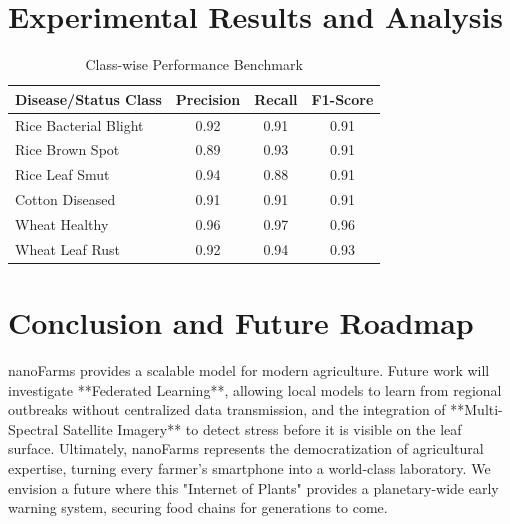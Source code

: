 \documentclass[11pt,onecolumn]{article}
\begin{document}
\section{Experimental Results and Analysis}
\begin{table}[h]
\centering
\caption{Class-wise Performance Benchmark}
\begin{tabular}{@{}lccc@{}}
\toprule
\textbf{Disease/Status Class} & \textbf{Precision} & \textbf{Recall} & \textbf{F1-Score} \\ \midrule
Rice Bacterial Blight        & 0.92 & 0.91 & 0.91 \\
Rice Brown Spot              & 0.89 & 0.93 & 0.91 \\
Rice Leaf Smut               & 0.94 & 0.88 & 0.91 \\
Cotton Diseased              & 0.91 & 0.91 & 0.91 \\
Wheat Healthy                & 0.96 & 0.97 & 0.96 \\
Wheat Leaf Rust              & 0.92 & 0.94 & 0.93 \\ \bottomrule
\end{tabular}
\end{table}

\section{Conclusion and Future Roadmap}
nanoFarms provides a scalable model for modern agriculture. Future work will investigate **Federated Learning**, allowing local models to learn from regional outbreaks without centralized data transmission, and the integration of **Multi-Spectral Satellite Imagery** to detect stress before it is visible on the leaf surface. Ultimately, nanoFarms represents the democratization of agricultural expertise, turning every farmer's smartphone into a world-class laboratory. We envision a future where this "Internet of Plants" provides a planetary-wide early warning system, securing food chains for generations to come.



\end{document}
